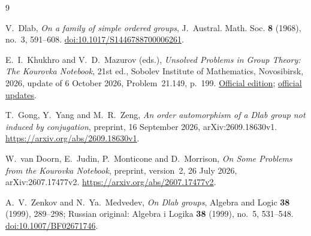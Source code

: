 \documentclass[10pt]{article}
\theoremstyle{definition}
\begin{document}
\begin{thebibliography}{9}

V.~Dlab, \emph{On a family of simple ordered groups},
J.~Austral. Math. Soc. \textbf{8} (1968), no.~3, 591--608.
\href{https://doi.org/10.1017/S1446788700006261}{doi:10.1017/S1446788700006261}.

E.~I.~Khukhro and V.~D.~Mazurov (eds.),
\emph{Unsolved Problems in Group Theory: The Kourovka Notebook},
21st ed., Sobolev Institute of Mathematics, Novosibirsk, 2026,
update of 6 October 2026, Problem~21.149, p.~199.
\href{https://kourovkanotebookorg.wordpress.com/wp-content/uploads/2026/10/21tkt-1.pdf}{Official edition};
\href{https://kourovkanotebookorg.wordpress.com/wp-content/uploads/2026/10/21upd-1.pdf}{official updates}.

T.~Gong, Y.~Yang and M.~R.~Zeng,
\emph{An order automorphism of a Dlab group not induced by conjugation},
preprint, 16 September 2026, arXiv:2609.18630v1.
\url{https://arxiv.org/abs/2609.18630v1}.

W.~van Doorn, E.~Judin, P.~Monticone and D.~Morrison,
\emph{On Some Problems from the Kourovka Notebook},
preprint, version~2, 26 July 2026, arXiv:2607.17477v2.
\url{https://arxiv.org/abs/2607.17477v2}.

A.~V.~Zenkov and N.~Ya.~Medvedev,
\emph{On Dlab groups}, Algebra and Logic \textbf{38} (1999),
289--298; Russian original: Algebra i Logika \textbf{38} (1999),
no.~5, 531--548.
\href{https://doi.org/10.1007/BF02671746}{doi:10.1007/BF02671746}.

\end{thebibliography}
\end{document}

